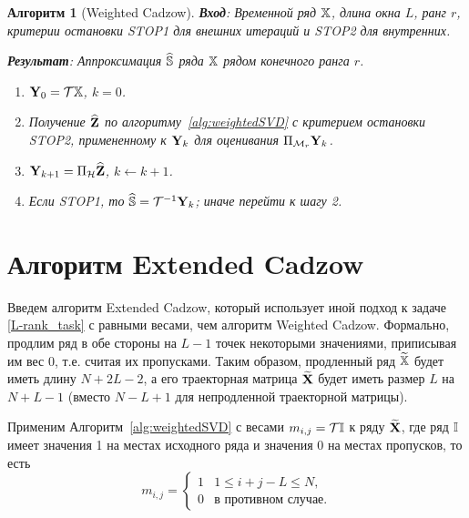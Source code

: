 \documentclass[12pt, specialist, subf,href,colorlinks=true,substylefile = spbu.rtx]{disser}
\newtheorem{algorithm}{Алгоритм}
\theoremstyle{remark}
\theoremstyle{definition}
\begin{document}
\begin{algorithm}[Weighted Cadzow] \label{alg:WCIt}
\textbf{Вход}: Временной ряд $\mathbb{X}$, длина окна $L$, ранг $r$,
критерии остановки STOP1 для внешних итераций и STOP2 для внутренних.

\textbf{Результат}:
Аппроксимация $\widehat{\mathbb{S}}$ ряда $\mathbb{X}$ рядом конечного ранга $r$.

\begin{enumerate}
\item
$\mathbf{Y}_0 = \mathcal{T} \mathbb{X}$, $k=0$.
\item
Получение $\widehat{\mathbf{Z}}$ по алгоритму~\ref{alg:weightedSVD} с критерием остановки STOP2, примененному к $\mathbf{Y}_k$ для оценивания $\Pi_{\mathcal{M}_r} \mathbf{Y}_{k}$.
\item
$\mathbf{Y}_{k+1} = \Pi_{\mathcal{H}}  \widehat{\mathbf{Z}}$, $k\leftarrow k+1$.
\item
Если STOP1, то $\widehat{\mathbb{S}} = \mathcal{T}^{-1} \mathbf{Y}_k$; иначе перейти к шагу 2.
\end{enumerate}
\end{algorithm}

\section{Алгоритм Extended Cadzow}

Введем алгоритм Extended Cadzow, который использует иной подход к задаче \eqref{L-rank_task} с равными весами, чем алгоритм Weighted Cadzow. Формально, продлим ряд в обе стороны на $L-1$ точек некоторыми значениями, приписывая им вес 0, т.е.
считая их пропусками. Таким образом, продленный ряд $\widetilde{\mathbb{X}}$ будет иметь длину $N+2L-2$, а его траекторная матрица
$\widetilde{\mathbf{X}}$ будет иметь размер $L$ на $N+L-1$ (вместо $N - L + 1$ для непродленной траекторной матрицы).

Применим Алгоритм~\ref{alg:weightedSVD} с весами $m_{i,j}=\mathcal{T} \mathbb{I}$ к ряду $\widetilde{\mathbf{X}}$, где ряд $\mathbb{I}$ имеет значения 1 на местах исходного ряда и значения 0 на местах пропусков, то есть
\begin{equation*}
m_{i,j} = \begin{cases}
1 & 1 \le i+j-L \le N, \\
0 & \text{в противном случае.}
\end{cases}
\end{equation*}
\end{document}
